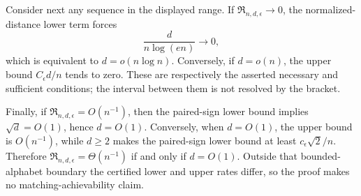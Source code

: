 Consider next any sequence in the displayed range.  If \(\mathfrak R_{n,d,\epsilon}\to0\), the normalized-distance lower term forces
\[
 \frac d{n\log(en)}\longrightarrow0,
\]
which is equivalent to \(d=o(n\log n)\).  Conversely, if \(d=o(n)\), the upper bound \(C_\epsilon d/n\) tends to zero.  These are respectively the asserted necessary and sufficient conditions; the interval between them is not resolved by the bracket.

Finally, if \(\mathfrak R_{n,d,\epsilon}=O(n^{-1})\), then the paired-sign lower bound implies \(\sqrt d=O(1)\), hence \(d=O(1)\).  Conversely, when \(d=O(1)\), the upper bound is \(O(n^{-1})\), while \(d\ge2\) makes the paired-sign lower bound at least \(c_\epsilon\sqrt2/n\).  Therefore \(\mathfrak R_{n,d,\epsilon}=\Theta(n^{-1})\) if and only if \(d=O(1)\).  Outside that bounded-alphabet boundary the certified lower and upper rates differ, so the proof makes no matching-achievability claim.